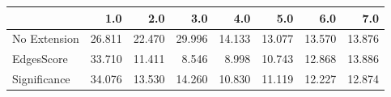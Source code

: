 \begin{tabular}{lrrrrrrr}
\toprule
{} &    1.0 &    2.0 &    3.0 &    4.0 &    5.0 &    6.0 &    7.0 \\
\midrule
No Extension & 26.811 & 22.470 & 29.996 & 14.133 & 13.077 & 13.570 & 13.876 \\
EdgesScore   & 33.710 & 11.411 &  8.546 &  8.998 & 10.743 & 12.868 & 13.886 \\
Significance & 34.076 & 13.530 & 14.260 & 10.830 & 11.119 & 12.227 & 12.874 \\
\bottomrule
\end{tabular}
